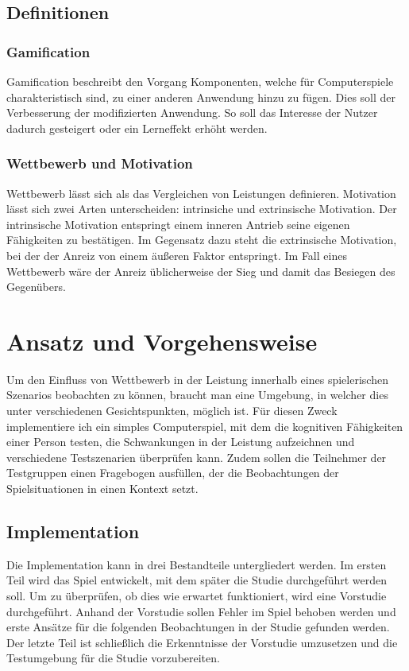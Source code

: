\section{Definitionen}
\subsection{Gamification}
Gamification beschreibt den Vorgang Komponenten, welche für Computerspiele charakteristisch sind, zu einer anderen Anwendung hinzu zu fügen. Dies soll der Verbesserung der modifizierten Anwendung. So soll das Interesse der Nutzer dadurch gesteigert oder ein Lerneffekt erhöht werden.

\subsection{Wettbewerb und Motivation}
Wettbewerb lässt sich als das Vergleichen von Leistungen definieren. Motivation lässt sich zwei Arten unterscheiden: intrinsiche und extrinsische Motivation.%
Der intrinsische Motivation entspringt einem inneren Antrieb seine eigenen Fähigkeiten zu bestätigen.%
Im Gegensatz dazu steht die extrinsische Motivation, bei der der Anreiz von einem äußeren Faktor entspringt. Im Fall eines Wettbewerb wäre der Anreiz üblicherweise der Sieg und damit das Besiegen des Gegenübers.\cite{Deci1981}




\chapter{Ansatz und Vorgehensweise}
 Um den Einfluss von Wettbewerb in der Leistung innerhalb eines spielerischen Szenarios beobachten zu können, braucht man eine Umgebung, in welcher dies unter verschiedenen Gesichtspunkten, möglich ist. Für diesen Zweck implementiere ich ein simples Computerspiel, mit dem die kognitiven Fähigkeiten einer Person testen, die Schwankungen in der Leistung aufzeichnen und verschiedene Testszenarien überprüfen kann. Zudem sollen die Teilnehmer der Testgruppen einen Fragebogen ausfüllen, der die Beobachtungen der Spielsituationen in einen Kontext setzt.
 
\section{Implementation}
Die Implementation kann in drei Bestandteile untergliedert werden. Im ersten Teil wird das Spiel entwickelt, mit dem später die Studie durchgeführt werden soll. Um zu überprüfen, ob dies wie erwartet funktioniert, wird eine Vorstudie durchgeführt. Anhand der Vorstudie sollen Fehler im Spiel behoben werden und erste Ansätze für die folgenden Beobachtungen in der Studie gefunden werden. Der letzte  Teil ist schließlich die Erkenntnisse der Vorstudie umzusetzen und die Testumgebung für die Studie vorzubereiten.

